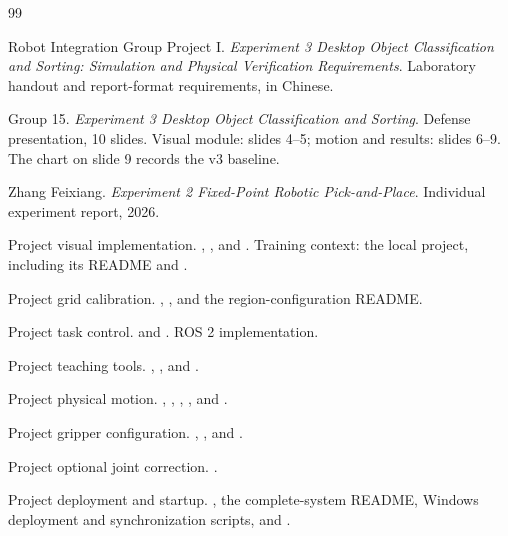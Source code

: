 \clearpage
{}
\begin{thebibliography}{99}
\small\raggedright
\setlength{\baselineskip}{10.4pt}
\setlength{\itemsep}{1pt}
\setlength{\parskip}{0pt}
Robot Integration Group Project I. \emph{Experiment 3 Desktop Object Classification and Sorting: Simulation and Physical Verification Requirements}. Laboratory handout and report-format requirements, in Chinese.

Group 15. \emph{Experiment 3 Desktop Object Classification and Sorting}. Defense presentation, 10 slides. Visual module: slides 4--5; motion and results: slides 6--9. The chart on slide 9 records the v3 baseline.

Zhang Feixiang. \emph{Experiment 2 Fixed-Point Robotic Pick-and-Place}. Individual experiment report, 2026.

Project visual implementation. , , and . Training context: the local  project, including its README and .

Project grid calibration. , , and the region-configuration README.

Project task control.  and . ROS 2 implementation.

Project teaching tools. , , and .

Project physical motion. , , , , and .

Project gripper configuration. , , and .

Project optional joint correction. .

Project deployment and startup. , the complete-system README, Windows deployment and synchronization scripts, and .


\end{thebibliography}
